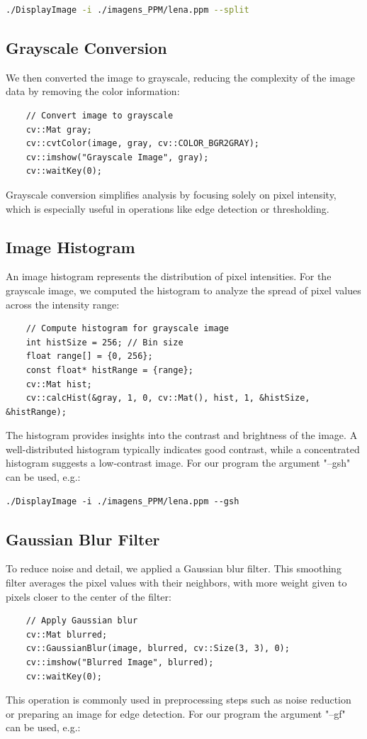 \documentclass[a4paper,12pt]{article}
\begin{document}
\lstset{basicstyle=\small\ttfamily}
\begin{lstlisting}[language=bash]
./DisplayImage -i ./imagens_PPM/lena.ppm --split
\end{lstlisting}

\subsection{Grayscale Conversion}
We then converted the image to grayscale, reducing the complexity of the image data by removing the color information:
\begin{verbatim}
    // Convert image to grayscale
    cv::Mat gray;
    cv::cvtColor(image, gray, cv::COLOR_BGR2GRAY);
    cv::imshow("Grayscale Image", gray);
    cv::waitKey(0);
\end{verbatim}
Grayscale conversion simplifies analysis by focusing solely on pixel intensity, which is especially useful in operations like edge detection or thresholding.

\subsection{Image Histogram}
An image histogram represents the distribution of pixel intensities. For the grayscale image, we computed the histogram to analyze the spread of pixel values across the intensity range:
\begin{verbatim}
    // Compute histogram for grayscale image
    int histSize = 256; // Bin size
    float range[] = {0, 256};
    const float* histRange = {range};
    cv::Mat hist;
    cv::calcHist(&gray, 1, 0, cv::Mat(), hist, 1, &histSize, &histRange);
\end{verbatim}
The histogram provides insights into the contrast and brightness of the image. A well-distributed histogram typically indicates good contrast, while a concentrated histogram suggests a low-contrast image.
For our program the argument "--gsh" can be used, e.g.:

\lstset{basicstyle=\small\ttfamily}
\begin{lstlisting}
./DisplayImage -i ./imagens_PPM/lena.ppm --gsh
\end{lstlisting}


\subsection{Gaussian Blur Filter}
To reduce noise and detail, we applied a Gaussian blur filter. This smoothing filter averages the pixel values with their neighbors, with more weight given to pixels closer to the center of the filter:
\begin{verbatim}
    // Apply Gaussian blur
    cv::Mat blurred;
    cv::GaussianBlur(image, blurred, cv::Size(3, 3), 0);
    cv::imshow("Blurred Image", blurred);
    cv::waitKey(0);
\end{verbatim}
This operation is commonly used in preprocessing steps such as noise reduction or preparing an image for edge detection.
For our program the argument "--gf" can be used, e.g.:
\end{document}
